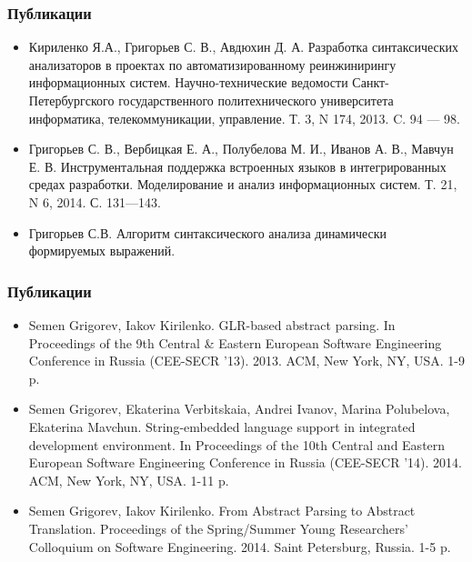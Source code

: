 \documentclass{beamer}
\begin{document}
\begin{frame}
	\transwipe[direction=90]
	\frametitle{Публикации}
  \begin{itemize}
	  \item Кириленко Я.А., Григорьев С. В., Авдюхин Д. А. Разработка синтаксических анализаторов в проектах по автоматизированному реинжинирингу информационных систем.  Научно-технические ведомости Санкт-Петербургского государственного политехнического университета информатика, телекоммуникации, управление. Т. 3, N 174, 2013. C. 94 --- 98.
 	  \item Григорьев С. В., Вербицкая Е. А., Полубелова М. И., Иванов А. В., Мавчун Е. В. Инструментальная поддержка встроенных языков в интегрированных средах разработки. Моделирование и анализ информационных систем. Т. 21, N 6, 2014. С. 131---143.
          \item Григорьев С.В. Алгоритм синтаксического анализа динамически формируемых выражений.
  \end{itemize}	
\end{frame}

\begin{frame}
	\transwipe[direction=90]
	\frametitle{Публикации}
  \begin{itemize}
          \item Semen Grigorev, Iakov Kirilenko. GLR-based abstract parsing. In Proceedings of the 9th Central \& Eastern European Software Engineering Conference in Russia (CEE-SECR ’13). 2013. ACM, New York, NY, USA. 1-9 p.
          \item Semen Grigorev, Ekaterina Verbitskaia, Andrei Ivanov, Marina Polubelova, Ekaterina Mavchun. String-embedded language support in integrated development environment. In Proceedings of the 10th Central and Eastern European Software Engineering Conference in Russia (CEE-SECR '14). 2014. ACM, New York, NY, USA. 1-11 p.
          \item Semen Grigorev, Iakov Kirilenko. From Abstract Parsing to Abstract Translation. Proceedings of the Spring/Summer Young Researchers' Colloquium on Software Engineering. 2014. Saint Petersburg, Russia. 1-5 p.
  \end{itemize}	
\end{frame}
\end{document}
